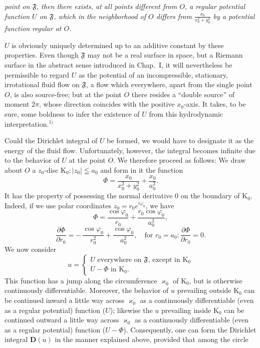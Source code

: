 \documentclass{article}
\begin{document}
\emph{point on $\mathfrak{F}$, then there exists, at all points different from $O$, a regular potential function $U$ on $\mathfrak{F}$, which in the neighborhood of $O$ differs from $\frac{x_0}{x_0^2 + y_0^2}$ by a potential function regular at $O$.}

$U$ is obviously uniquely determined up to an additive constant by these properties. Even though $\mathfrak{F}$ may not be a real surface in space, but a Riemann surface in the abstract sense introduced in Chap.~I, it will nevertheless be permissible to regard $U$ as the potential of an incompressible, stationary, irrotational fluid flow on $\mathfrak{F}$, a flow which everywhere, apart from the single point $O$, is also source-free; but at the point $O$ there resides a ``double source'' of moment $2\pi$, whose direction coincides with the positive $x_0$-axis. It takes, to be sure, some boldness to infer the existence of $U$ from this hydrodynamic interpretation.${}^{1)}$

Could the Dirichlet integral of $U$ be formed, we would have to designate it as the energy of the fluid flow. Unfortunately, however, the integral becomes infinite due to the behavior of $U$ at the point $O$. We therefore proceed as follows: We draw about $O$ a $z_0$-disc $\mathrm{K}_0\colon |z_0| \leqq a_0$ and form in it the function
\[ \Phi = \frac{x_0}{x_0^2 + y_0^2} + \frac{x_0}{a_0^2}. \]
It has the property of possessing the normal derivative $0$ on the boundary of $\mathrm{K}_0$. Indeed, if we use polar coordinates $z_0 = r_0 e^{i\varphi_0}$, we have
\[ \Phi = \frac{\cos\varphi_0}{r_0} + \frac{r_0 \cos\varphi_0}{a_0^2}, \]
\[ \frac{\partial\Phi}{\partial r_0} = -\,\frac{\cos\varphi_0}{r_0^2} + \frac{\cos\varphi_0}{a_0^2}, \quad \text{for } r_0 = a_0\colon \frac{\partial\Phi}{\partial r_0} = 0. \]
We now consider
\[ u = \begin{cases}
U \text{ everywhere on } \mathfrak{F}\text{, except in } \mathrm{K}_0 \\
U - \Phi \text{ in } \mathrm{K}_0.
\end{cases} \]
This function has a jump along the circumference $\varkappa_0$ of $\mathrm{K}_0$, but is otherwise continuously differentiable. Moreover, the behavior of $u$ prevailing outside $\mathrm{K}_0$ can be continued inward a little way across $\varkappa_0$ as a continuously differentiable (even as a regular potential) function ($U$); likewise the $u$ prevailing inside $\mathrm{K}_0$ can be continued outward a little way across $\varkappa_0$ as a continuously differentiable (even as a regular potential) function ($U - \Phi$). Consequently, one can form the Dirichlet integral $\mathbf{D}(u)$ in the manner explained above, provided that among the circle
\end{document}
